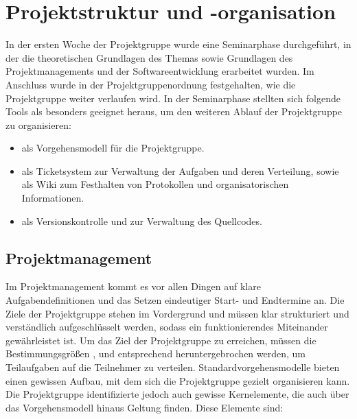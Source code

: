 \chapter{Projektstruktur und -organisation}
\label{sec:orga}

In der ersten Woche der Projektgruppe wurde eine Seminarphase durchgeführt, in
der die theoretischen Grundlagen des Themas sowie Grundlagen des
Projektmanagements und der Softwareentwicklung erarbeitet wurden. Im Anschluss wurde in
der Projektgruppenordnung festgehalten, wie die Projektgruppe weiter verlaufen
wird. In der Seminarphase stellten sich folgende Tools als besonders geeignet
heraus, um den weiteren Ablauf der Projektgruppe zu organisieren:

\begin{itemize}
    \item {} als Vorgehensmodell für die Projektgruppe.
    \item {} als Ticketsystem zur Verwaltung der Aufgaben und deren
      Verteilung, sowie als Wiki zum Festhalten von Protokollen und
      organisatorischen Informationen.
    \item {} als Versionskontrolle und zur Verwaltung des Quellcodes.
\end{itemize}

\section{Projektmanagement}
\label{sec:orga:projekt}

Im Projektmanagement kommt es vor allen Dingen auf klare
Aufgabendefinitionen und das Setzen eindeutiger Start- und Endtermine an. Die Ziele der Projektgruppe stehen im Vordergrund und müssen klar
strukturiert und verständlich aufgeschlüsselt werden, sodass ein
funktionierendes Miteinander gewährleistet ist. Um das Ziel der Projektgruppe zu erreichen, müssen die Bestimmungsgrößen ,  und  entsprechend
heruntergebrochen werden, um Teilaufgaben auf die Teilnehmer zu verteilen.
Standardvorgehensmodelle bieten einen gewissen Aufbau, mit dem sich die
Projektgruppe gezielt organisieren kann. Die Projektgruppe identifizierte jedoch
auch gewisse Kernelemente, die auch über das Vorgehensmodell hinaus Geltung
finden. Diese Elemente sind:

